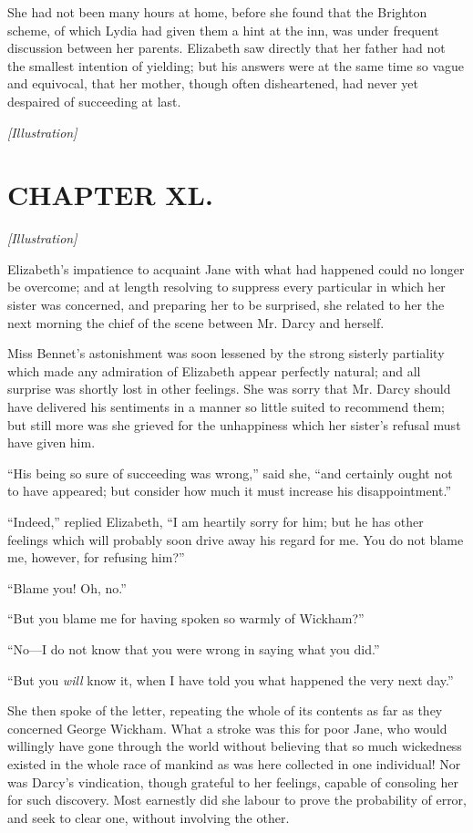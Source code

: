 \documentclass[12pt]{book}
\begin{document}
She had not been many hours at home, before she found that the Brighton scheme, of which Lydia had given them a hint at the inn, was under frequent discussion between her parents. Elizabeth saw directly that her father had not the smallest intention of yielding; but his answers were at the same time so vague and equivocal, that her mother, though often disheartened, had never yet despaired of succeeding at last.

\emph{[Illustration]}

\chapter{CHAPTER XL.}

\emph{[Illustration]}

Elizabeth's impatience to acquaint Jane with what had happened could no longer be overcome; and at length resolving to suppress every particular in which her sister was concerned, and preparing her to be surprised, she related to her the next morning the chief of the scene between Mr. Darcy and herself.

Miss Bennet's astonishment was soon lessened by the strong sisterly partiality which made any admiration of Elizabeth appear perfectly natural; and all surprise was shortly lost in other feelings. She was sorry that Mr. Darcy should have delivered his sentiments in a manner so little suited to recommend them; but still more was she grieved for the unhappiness which her sister's refusal must have given him.

``His being so sure of succeeding was wrong,'' said she, ``and certainly ought not to have appeared; but consider how much it must increase his disappointment.''

``Indeed,'' replied Elizabeth, ``I am heartily sorry for him; but he has other feelings which will probably soon drive away his regard for me. You do not blame me, however, for refusing him?''

``Blame you! Oh, no.''

``But you blame me for having spoken so warmly of Wickham?''

``No---I do not know that you were wrong in saying what you did.''

``But you \textit{will} know it, when I have told you what happened the very next day.''

She then spoke of the letter, repeating the whole of its contents as far as they concerned George Wickham. What a stroke was this for poor Jane, who would willingly have gone through the world without believing that so much wickedness existed in the whole race of mankind as was here collected in one individual! Nor was Darcy's vindication, though grateful to her feelings, capable of consoling her for such discovery. Most earnestly did she labour to prove the probability of error, and seek to clear one, without involving the other.
\end{document}
